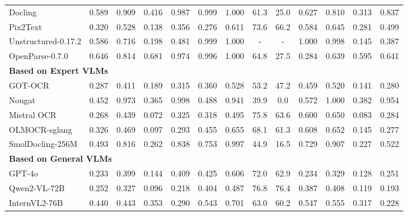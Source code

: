 \begin{table}[t]
\begin{threeparttable}
{\begin{tabular}{l cc | cc  cc cc cc cc }
    Docling~\citep{livathinos2025docling}
        & 0.589 & 0.909
        & 0.416 & 0.987
        & 0.999 & 1.000
        & 61.3 & 25.0
        & 0.627 & 0.810
        & 0.313 & 0.837 \\
    Pix2Text~\citep{gurgurov2024image}
        & 0.320 & 0.528
        & 0.138 & 0.356
        & 0.276 & 0.611
        & 73.6 & 66.2
        & 0.584 & 0.645
        & 0.281 & 0.499 \\
    Unstructured-0.17.2
        & 0.586 & 0.716
        & 0.198 & 0.481
        & 0.999 & 1.000
        & - & -
        & 1.000 & 0.998
        & 0.145 & 0.387 \\
    OpenParse-0.7.0
        & 0.646 & 0.814
        & 0.681 & 0.974
        & 0.996 & 1.000
        & 64.8 & 27.5
        & 0.284 & 0.639
        & 0.595 & 0.641 \\
    \midrule
    \multicolumn{6}{l}{\textbf{Based on Expert VLMs}} \\
      GOT-OCR~\citep{got2} 
        & 0.287 & 0.411
        & 0.189 & 0.315 
        & 0.360 & 0.528
        & 53.2 & 47.2
        & 0.459 & 0.520
        & 0.141 & 0.280 \\
      Nougat~\citep{Nougat} 
        & 0.452 & 0.973
        & 0.365 & 0.998 
        & 0.488 & 0.941
        & 39.9 & 0.0
        & 0.572 & 1.000
        & 0.382 & 0.954 \\
    Mistral OCR
        & 0.268 & 0.439
        & 0.072 & 0.325
        & 0.318 & 0.495
        & 75.8 & 63.6
        & 0.600 & 0.650
        & 0.083 & 0.284 \\
    OLMOCR-sglang
        & 0.326 & 0.469
        & 0.097 & 0.293
        & 0.455 & 0.655
        & 68.1 & 61.3
        & 0.608 & 0.652
        & 0.145 & 0.277 \\
    SmolDocling-256M
        & 0.493 & 0.816
        & 0.262 & 0.838
        & 0.753 & 0.997
        & 44.9 & 16.5
        & 0.729 & 0.907
        & 0.227 & 0.522 \\
        
    \midrule
    \multicolumn{6}{l}{\textbf{Based on General VLMs}} \\
      GPT-4o~\citep{GPT4} 
        & 0.233 & 0.399
        & 0.144 & 0.409
        & 0.425 & 0.606
        & 72.0 & 62.9
        & 0.234 & 0.329
        & 0.128 & 0.251 \\
    
    Qwen2-VL-72B~\citep{wang2024qwen2}   
        & 0.252 & 0.327
        & 0.096 & 0.218
        & 0.404 & 0.487
        & 76.8 & 76.4
        & 0.387 & 0.408
        & 0.119 & 0.193 \\
    InternVL2-76B~\citep{InternVL}  
        & 0.440 & 0.443
        & 0.353 & 0.290
        & 0.543 & 0.701
        & 63.0 & 60.2
        & 0.547 & 0.555
        & 0.317 & 0.228 \\ 


\end{tabular}}
\end{threeparttable}
\end{table}
